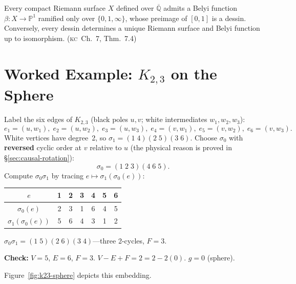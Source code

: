 \documentclass[11pt, a4paper, openany]{book}
\newcommand{\KC}[1]{\textnormal{(\textsc{kc}~#1)}}
\newcounter{thm}[chapter]
\begin{document}
\begin{theorem}\label{thm:belyi}
Every compact Riemann surface $X$ defined over $\overline{\mathbb{Q}}$ admits a Belyi function $\beta : X \to \mathbb{P}^1$ ramified only over $\{0, 1, \infty\}$, whose preimage of $[0,1]$ is a dessin. Conversely, every dessin determines a unique Riemann surface and Belyi function up to isomorphism. \cite{belyi1979} \KC{Ch.~7, Thm.~7.4}
\end{theorem}

\section{Worked Example: $K_{2,3}$ on the Sphere}

Label the six edges of $K_{2,3}$ (black poles $u,v$; white intermediates $w_1, w_2, w_3$):
\[
  e_1 = (u,w_1),\; e_2 = (u,w_2),\; e_3 = (u,w_3),\;
  e_4 = (v,w_1),\; e_5 = (v,w_2),\; e_6 = (v,w_3).
\]
White vertices have degree~2, so $\sigma_1 = (1\;4)(2\;5)(3\;6)$. Choose $\sigma_0$ with \textbf{reversed} cyclic order at $v$ relative to $u$ (the physical reason is proved in \S\ref{sec:causal-rotation}):
\[
  \sigma_0 = (1\;2\;3)(4\;6\;5).
\]
Compute $\sigma_0\sigma_1$ by tracing $e \mapsto \sigma_1(\sigma_0(e))$:
\begin{center}
\renewcommand{\arraystretch}{1.15}
\begin{tabular}{c@{\;\;}c@{\;\;}c@{\;\;}c@{\;\;}c@{\;\;}c@{\;\;}c}
\toprule
$e$ & 1 & 2 & 3 & 4 & 5 & 6 \\
\midrule
$\sigma_0(e)$ & 2 & 3 & 1 & 6 & 4 & 5 \\
$\sigma_1(\sigma_0(e))$ & 5 & 6 & 4 & 3 & 1 & 2 \\
\bottomrule
\end{tabular}
\end{center}
$\sigma_0\sigma_1 = (1\;5)(2\;6)(3\;4)$---three 2-cycles, $F = 3$.

\noindent
\textbf{Check:} $V = 5$, $E = 6$, $F = 3$. $V - E + F = 2 = 2 - 2(0)$. $\boxed{g = 0}$ (sphere). \checkmark

\noindent
Figure~\ref{fig:k23-sphere} depicts this embedding.
\end{document}

